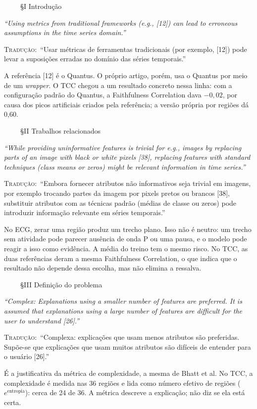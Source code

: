 \documentclass[11pt,a4paper]{article}
\newcommand{\pagechip}[1]{{\setlength{\fboxsep}{1.5pt}\colorbox{cAcc}{\textcolor{white}{\scriptsize\texttt{#1}}}}}
\newenvironment{origquote}{\par\itshape\small}{\par}
\newenvironment{tradquote}{\par\small\textsc{Tradução:}\ }{\par}
\newcommand{\explab}[1]{\par\smallskip{\small\color{cAcc}\textbf{\MakeUppercase{#1}}}\par}
\begin{document}
\begin{citacard}{\pagechip{p. 1} §I Introdução}
\begin{origquote}“Using metrics from traditional frameworks (e.g., [12]) can lead to erroneous assumptions in the time series domain.”\end{origquote}
\begin{tradquote}“Usar métricas de ferramentas tradicionais (por exemplo, [12]) pode levar a suposições erradas no domínio das séries temporais.”\end{tradquote}
\explab{Explicação}
A referência [12] é o Quantus. O próprio artigo, porém, usa o Quantus por meio de um \textit{wrapper}. O TCC chegou a um resultado concreto nessa linha: com a configuração padrão do Quantus, a Faithfulness Correlation dava $-0{,}02$, por causa dos picos artificiais criados pela referência; a versão própria por regiões dá 0,60.
\end{citacard}

\begin{citacard}{\pagechip{p. 2} §II Trabalhos relacionados}
\begin{origquote}“While providing uninformative features is trivial for e.g., images by replacing parts of an image with black or white pixels [38], replacing features with standard techniques (class means or zeros) might be relevant information in time series.”\end{origquote}
\begin{tradquote}“Embora fornecer atributos não informativos seja trivial em imagens, por exemplo trocando partes da imagem por pixels pretos ou brancos [38], substituir atributos com as técnicas padrão (médias de classe ou zeros) pode introduzir informação relevante em séries temporais.”\end{tradquote}
\explab{Explicação}
No ECG, zerar uma região produz um trecho plano. Isso não é neutro: um trecho sem atividade pode parecer ausência de onda P ou uma pausa, e o modelo pode reagir a isso como evidência. A média do treino tem o mesmo risco. No TCC, as duas referências deram a mesma Faithfulness Correlation, o que indica que o resultado não depende dessa escolha, mas não elimina a ressalva.
\end{citacard}

\begin{citacard}{\pagechip{p. 2} §III Definição do problema}
\begin{origquote}“Complex: Explanations using a smaller number of features are preferred. It is assumed that explanations using a large number of features are difficult for the user to understand [26].”\end{origquote}
\begin{tradquote}“Complexa: explicações que usam menos atributos são preferidas. Supõe-se que explicações que usam muitos atributos são difíceis de entender para o usuário [26].”\end{tradquote}
\explab{Explicação}
É a justificativa da métrica de complexidade, a mesma de Bhatt et al. No TCC, a complexidade é medida nas 36 regiões e lida como número efetivo de regiões ($e^{\text{entropia}}$): cerca de 24 de 36. A métrica descreve a explicação; não diz se ela está certa.
\end{citacard}
\end{document}
